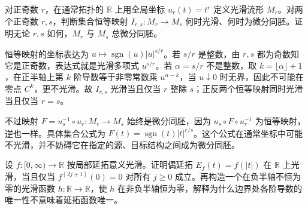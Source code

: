 \begin{exercise}
	\label{g1:ex:transported-line-powers}
	对正奇数 \(r\)，在通常拓扑的 \(\mathbb R\) 上用全局坐标 \(u_r(t)=t^r\) 定义光滑流形 \(M_r\)。对两个正奇数 \(r,s\)，判断集合恒等映射 \(I_{r,s}:M_r\to M_s\) 何时光滑、何时为微分同胚。证明无论 \(r,s\) 如何，\(M_r\) 与 \(M_s\) 总微分同胚。
\end{exercise}

\begin{solution}
	恒等映射的坐标表达为 \(u\mapsto\operatorname{sgn}(u)|u|^{s/r}\)。若 \(s/r\) 是整数，由 \(r,s\) 都为奇数知它是正奇数，表达式就是光滑多项式 \(u^{s/r}\)。若 \(\alpha=s/r\) 不是整数，取 \(k=\lfloor\alpha\rfloor+1\)，在正半轴上第 \(k\) 阶导数等于非零常数乘 \(u^{\alpha-k}\)，当 \(u\downarrow0\) 时无界，因此不可能在零点 \(C^k\)，更不光滑。故 \(I_{r,s}\) 光滑当且仅当 \(r\) 整除 \(s\)；正反两个恒等映射同时光滑当且仅当 \(r=s\)。

	不过映射 \(F=u_s^{-1}\circ u_r:M_r\to M_s\) 始终是微分同胚，因为 \(u_s\circ F\circ u_r^{-1}\) 为恒等映射，逆也一样。具体集合公式为 \(F(t)=\operatorname{sgn}(t)|t|^{r/s}\)。这个公式在通常坐标中可能不光滑，并不妨碍它在指定的源、目标结构之间成为微分同胚。
\end{solution}

\begin{exercise}
	\label{g1:ex:boundary-even-extension}
	设 \(f:[0,\infty)\to\mathbb R\) 按局部延拓意义光滑。证明偶延拓 \(E_f(t)=f(|t|)\) 在 \(\mathbb R\) 上光滑，当且仅当 \(f^{(2j+1)}(0)=0\) 对所有 \(j\geq0\) 成立。再构造一个在负半轴不恒为零的光滑函数 \(h:\mathbb R\to\mathbb R\)，使 \(h\) 在非负半轴恒为零，解释为什么边界处各阶导数的唯一性不意味着延拓函数唯一。
\end{exercise}

